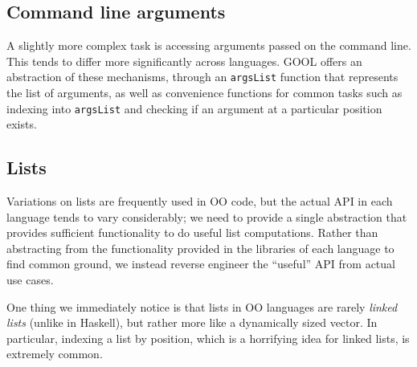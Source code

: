 \documentclass[sigplan,review,prologue,dvipsnames]{acmart}
\begin{document}
\subsection{Command line arguments}

A slightly more complex task is accessing arguments passed on the command
line. This tends to differ more significantly across languages. GOOL
offers an abstraction of these mechanisms, through an \verb|argsList| function
that represents the list of arguments, as well as convenience functions for
common tasks such as indexing into \verb|argsList| and checking if an argument
at a particular position exists. 

\subsection{Lists}

Variations on lists are frequently used in OO code, but the actual API
in each language tends to vary considerably; we need to provide a single
abstraction that provides sufficient functionality to do useful list
computations.  Rather than abstracting from the functionality provided
in the libraries of each language to find common ground, we instead
reverse engineer the ``useful'' API from actual use cases.  

One thing we immediately notice is that lists in
OO languages are rarely \emph{linked lists} (unlike in Haskell), but rather 
more like a dynamically sized vector. In particular, 
indexing a list by position, which is a horrifying idea for linked lists,
is extremely common.
\end{document}
